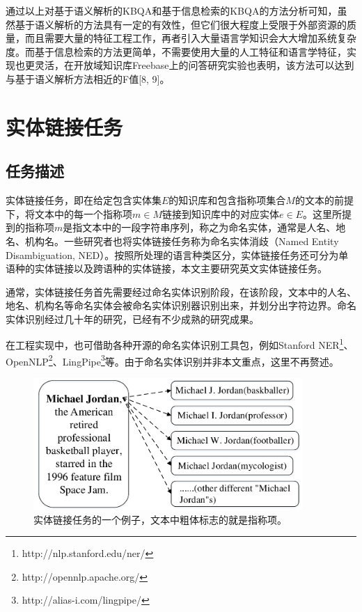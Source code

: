 通过以上对基于语义解析的KBQA和基于信息检索的KBQA的方法分析可知，虽然基于语义解析的方法具有一定的有效性，但它们很大程度上受限于外部资源的质量，而且需要大量的特征工程工作，再者引入大量语言学知识会大大增加系统复杂度。而基于信息检索的方法更简单，不需要使用大量的人工特征和语言学特征，实现也更灵活，在开放域知识库Freebase上的问答研究实验也表明，该方法可以达到与基于语义解析方法相近的F值[8, 9]。

\section{实体链接任务}
\subsection{任务描述}
实体链接任务，即在给定包含实体集$E$的知识库和包含指称项集合$M$的文本的前提下，将文本中的每一个指称项$m\in M$链接到知识库中的对应实体$e\in E$。这里所提到的指称项$m$是指文本中的一段字符串序列，称之为命名实体，通常是人名、地名、机构名。一些研究者也将实体链接任务称为命名实体消歧（Named Entity Disambiguation, NED）。按照所处理的语言种类区分，实体链接任务还可分为单语种的实体链接以及跨语种的实体链接\cite{CLELBBTM}，本文主要研究英文实体链接任务。

通常，实体链接任务首先需要经过命名实体识别阶段，在该阶段，文本中的人名、地名、机构名等命名实体会被命名实体识别器识别出来，并划分出字符边界。命名实体识别经过几十年的研究，已经有不少成熟的研究成果\cite{RWNERST,NEROEHRTCDA,RHENERCCBEL}。

在工程实现中，也可借助各种开源的命名实体识别工具包，例如Stanford NER\footnote{http://nlp.stanford.edu/ner/}、OpenNLP\footnote{http://opennlp.apache.org/}、LingPipe\footnote{http://alias-i.com/lingpipe/}等。由于命名实体识别并非本文重点，这里不再赘述。

\begin{figure}[!htb]
	\centering\includegraphics[height=5cm]{resource/el_example}
	\caption{实体链接任务的一个例子，文本中粗体标志的就是指称项。}
	\label{fig:el_example}
\end{figure}

